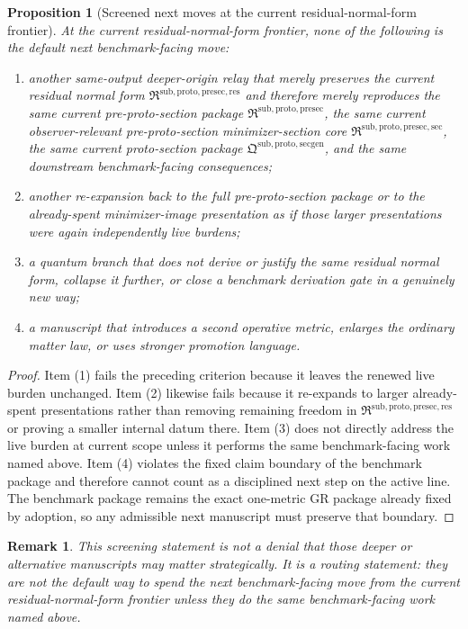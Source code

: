 \documentclass[11pt]{article}
\newcommand{\PreProtoSectionPackage}{\mathfrak R^{\mathrm{sub,proto,presec}}}
\newcommand{\PreProtoSectionMinSectionCore}{\mathfrak R^{\mathrm{sub,proto,presec,sec}}}
\newcommand{\PreProtoSectionResidualPackage}{\mathfrak R^{\mathrm{sub,proto,presec,res}}}
\newcommand{\ProtoSectionPackage}{\mathfrak Q^{\mathrm{sub,proto,secgen}}}
\newtheorem{proposition}{Proposition}
\newtheorem{remark}{Remark}
\begin{document}
\begin{proposition}[Screened next moves at the current residual-normal-form frontier]
At the current residual-normal-form frontier, none of the following is the default next benchmark-facing move:
\begin{enumerate}
    \item another same-output deeper-origin relay that merely preserves the current residual normal form \(\PreProtoSectionResidualPackage\) and therefore merely reproduces the same current pre-proto-section package \(\PreProtoSectionPackage\), the same current observer-relevant pre-proto-section minimizer-section core \(\PreProtoSectionMinSectionCore\), the same current proto-section package \(\ProtoSectionPackage\), and the same downstream benchmark-facing consequences;
    \item another re-expansion back to the full pre-proto-section package or to the already-spent minimizer-image presentation as if those larger presentations were again independently live burdens;
    \item a quantum branch that does not derive or justify the same residual normal form, collapse it further, or close a benchmark derivation gate in a genuinely new way;
    \item a manuscript that introduces a second operative metric, enlarges the ordinary matter law, or uses stronger promotion language.
\end{enumerate}
\end{proposition}

\begin{proof}
Item (1) fails the preceding criterion because it leaves the renewed live burden unchanged. Item (2) likewise fails because it re-expands to larger already-spent presentations rather than removing remaining freedom in \(\PreProtoSectionResidualPackage\) or proving a smaller internal datum there. Item (3) does not directly address the live burden at current scope unless it performs the same benchmark-facing work named above. Item (4) violates the fixed claim boundary of the benchmark package and therefore cannot count as a disciplined next step on the active line. The benchmark package remains the exact one-metric GR package already fixed by adoption, so any admissible next manuscript must preserve that boundary.
\end{proof}

\begin{remark}
This screening statement is not a denial that those deeper or alternative manuscripts may matter strategically. It is a routing statement: they are not the default way to spend the next benchmark-facing move from the current residual-normal-form frontier unless they do the same benchmark-facing work named above.
\end{remark}
\end{document}
